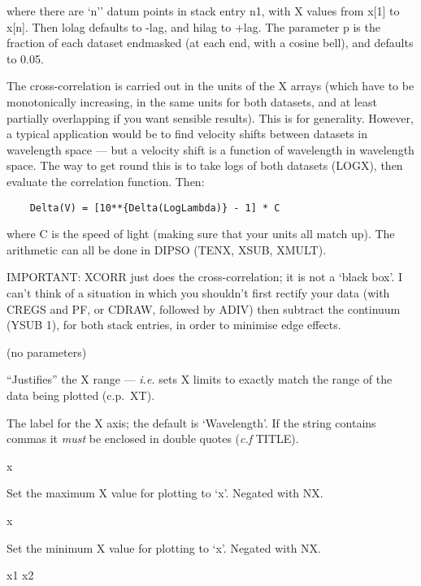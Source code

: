 \begin {description}
where there are `n'' datum points in stack entry n1, with X values from
x[1] to x[n]. Then lolag defaults to -lag, and hilag to +lag. The
parameter p is the fraction of each dataset endmasked (at each end,
with a cosine bell), and defaults to 0.05.

The cross-correlation is carried out in the units of the X arrays
(which have to be monotonically increasing, in the same units for both
datasets, and at least partially overlapping if you want sensible
results). This is for generality. However, a typical application would
be to find velocity shifts between datasets in wavelength space ---
but a velocity shift is a function of wavelength in wavelength space.
The way to get round this is to take logs of both datasets (LOGX),
then evaluate the correlation function. Then:

\begin{verbatim}
    Delta(V) = [10**{Delta(LogLambda)} - 1] * C
\end{verbatim}

where C is the speed of light (making sure that your units all match
up). The arithmetic can all be done in DIPSO (TENX, XSUB, XMULT).

IMPORTANT:   XCORR just does the cross-correlation;  it is not a
`black box'. I can't think of a situation in which you shouldn't first
rectify your data (with CREGS and PF, or CDRAW, followed by ADIV) then
subtract the continuum (YSUB 1), for both stack entries, in order to
minimise edge effects.

\item [XJ] (no parameters)

``Justifies'' the X range --- {\em i.e.} sets X limits to exactly
match the range of the data being plotted (c.p.\ XT).

\item[XLAB] [string]

The label for the X axis; the default is `Wavelength'. If the string
contains commas it {\em must} be enclosed in double quotes ({\it c.f}
TITLE).

\item [XMAX] x

Set the maximum X value for plotting to `x'.
Negated with NX.

\item [XMIN] x

Set the minimum X value for plotting to `x'.
Negated with NX.

\item [XR] x1 x2


\end{description}
